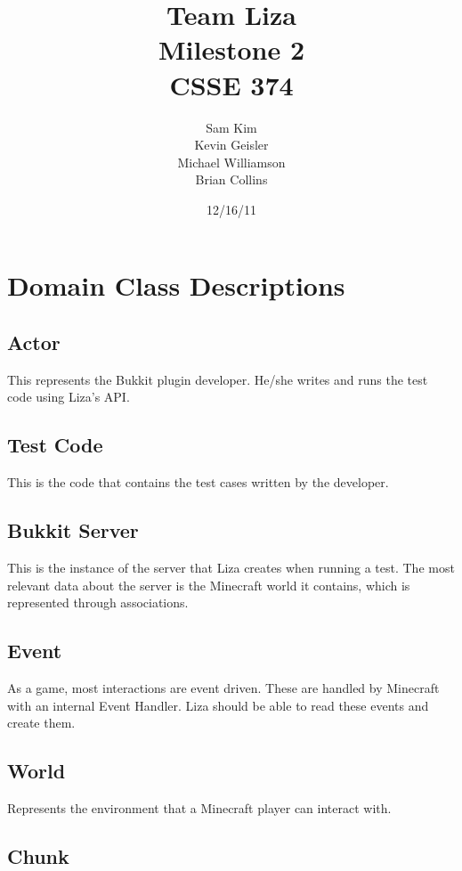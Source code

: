 \documentclass{article}
\title{Team Liza \\ Milestone 2 \\ CSSE 374}
\author{Sam Kim \\ Kevin Geisler \\ Michael Williamson \\ Brian Collins}
\date{12/16/11}
\begin{document}
\maketitle
\newpage



\section*{Domain Class Descriptions}

\subsection*{Actor}

This represents the Bukkit plugin developer. He/she writes and runs the
test code using Liza's API.

\subsection*{Test Code}

This is the code that contains the test cases written by the developer. 

\subsection*{Bukkit Server}

This is the instance of the server that Liza creates when running a test.
The most relevant data about the server is the Minecraft world it contains,
which is represented through associations.

\subsection*{Event}

As a game, most interactions are event driven. These are handled by
Minecraft with an internal Event Handler. Liza should be able to read these
events and create them.

\subsection*{World}

Represents the environment that a Minecraft player can interact with. 

\subsection*{Chunk}
\end{document}
